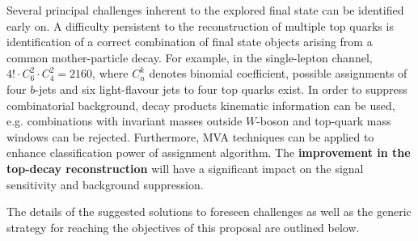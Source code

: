 Several principal challenges inherent to the explored final state can be identified early on. 
A difficulty persistent to the reconstruction of multiple top quarks is identification of a correct combination of final state objects arising from a common mother-particle decay. For example, in the single-lepton channel, $4!\cdot C_6^2 \cdot C_4^2 = 2160$, where $C_n^k$ denotes binomial coefficient, possible assignments of four $b$-jets and six light-flavour jets to four top quarks exist. In order to suppress combinatorial background, decay products kinematic information can be used, e.g. combinations with invariant masses outside $W$-boson and top-quark mass windows can be rejected. Furthermore, MVA techniques can be applied to enhance classification power of assignment algorithm. The \textbf{improvement in the top-decay reconstruction} will have a significant impact on the signal sensitivity and background suppression.

The details of the suggested solutions to foreseen challenges as well as the generic strategy for reaching the objectives of this proposal are outlined below.
% 
